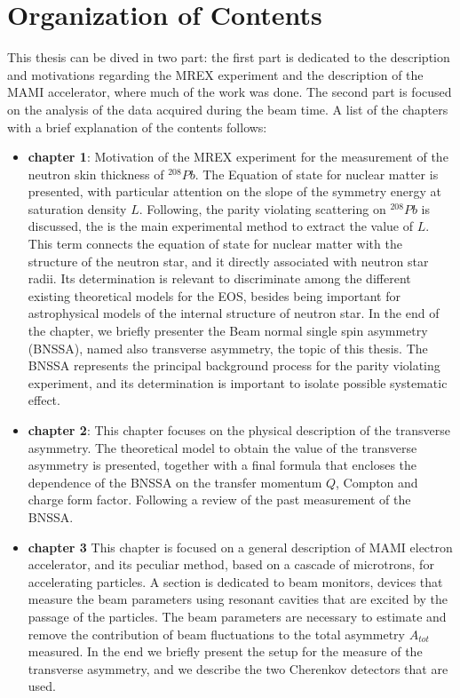 \chapter*{Organization of Contents}

This thesis can be dived in two part: the first part is dedicated to the description and motivations regarding the MREX  experiment and the description of the MAMI accelerator, where much of the work was done. The second part is focused on the analysis of the data acquired during the beam time. A list of the chapters with a brief explanation of the contents follows:

\begin{itemize}
\item \textbf{chapter 1}: Motivation of the MREX experiment for the measurement of the neutron skin thickness of $^{208}Pb$. The Equation of state for nuclear matter is presented, with particular attention on the slope of the symmetry energy at saturation density $L$. Following, the parity violating scattering on $^{208}Pb$ is discussed, the is the main experimental method to extract the value of $L$. This term connects the equation of state for nuclear matter with the structure of the neutron star, and it directly associated with neutron star radii. Its determination is relevant to discriminate among the different existing theoretical models for the EOS, besides being important for astrophysical models of the internal structure of neutron star. In the end of the chapter, we briefly presenter the Beam normal single spin asymmetry (BNSSA), named also transverse asymmetry, the topic of this thesis. The BNSSA represents the principal background process for the parity violating experiment, and its determination is important to isolate possible systematic effect. 
\item \textbf{chapter 2}: This chapter focuses on the physical description of the transverse asymmetry. The theoretical model to obtain the value of the transverse asymmetry is presented, together with a final formula that encloses the dependence of the BNSSA on the transfer momentum $Q$, Compton and charge form factor. Following a review of the past measurement of the BNSSA.  
\item \textbf{chapter 3} This chapter is focused on a general description of MAMI electron accelerator, and its peculiar method, based on a cascade of microtrons, for accelerating particles. A section is dedicated to beam monitors, devices that measure the beam parameters using resonant cavities that are excited by the passage of the particles. The beam parameters are necessary to estimate and remove the contribution of beam fluctuations to the total asymmetry $A_{tot}$ measured. In the end we briefly present the setup for the measure of the transverse asymmetry, and we describe the two Cherenkov detectors that are used.

\end{itemize}
